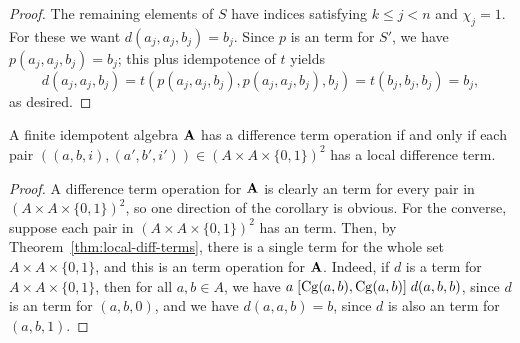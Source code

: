 \begin{proof}
The remaining elements of $S$
have indices satisfying $k\leq j < n$ and $\chi_j = 1$.
For these we want $d(a_j,a_j,b_j) = b_j$.
Since $p$ is an \ld term for $S'$, we have
$p(a_j,a_j,b_j) = b_j$; this plus idempotence of $t$ yields
\[ d(a_j,a_j,b_j) =  t(p(a_j,a_j,b_j), p(a_j,a_j,b_j), b_j)=  t(b_j, b_j, b_j) =b_j,\]
as desired.
\end{proof}

\begin{corollary}
  \label{cor:loc-diff-term}
  A finite idempotent algebra $\mathbf{A}$ has a difference term operation if and
  only if each pair $((a,b,i), (a',b',i')) \in (A\times A \times \{0,1\})^2$ 
  has a local difference term.
\end{corollary}
\begin{proof}
  A difference term operation for $\mathbf{A}$ is clearly an \ld term for every pair in 
  $(A\times A \times \{0,1\})^2$, so one direction of the corollary is obvious.
  For the converse, suppose
  each pair in $(A\times A \times \{0,1\})^2$ has an \ld term. 
  Then, by Theorem~\ref{thm:local-diff-terms},
  there is a single \ld term for the whole set $A\times A \times \{0,1\}$,
  and this is an \ld term operation for $\mathbf{A}$.  Indeed, if $d$ is a
  \ld term for $A\times A \times \{0,1\}$, then
  for all $a, b \in A$, we have
  $a \mathrel{[\operatorname{Cg}(a,b), \operatorname{Cg}(a,b)]} d(a,b,b)$,
  since $d$ is an \ld term for $(a,b,0)$, and we have
  $d(a,a,b) = b$, since $d$ is also an \ld term for
  $(a,b,1)$.
\end{proof}


